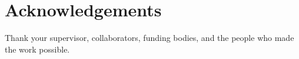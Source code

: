 \chapter*{Acknowledgements}

Thank your supervisor, collaborators, funding bodies, and the people who
made the work possible.
